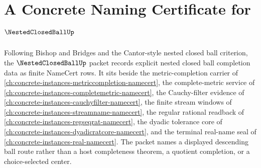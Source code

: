 \chapter{A Concrete Naming Certificate for $\NestedClosedBallUp$}
\label{ch:concrete-instances-nestedclosedball-namecert}

Following Bishop and Bridges and the Cantor-style nested closed ball criterion, the $\NestedClosedBallUp$ packet records explicit nested closed ball completion data as finite NameCert rows. It sits beside the metric-completion carrier of \autoref{ch:concrete-instances-metriccompletion-namecert}, the complete-metric service of \autoref{ch:concrete-instances-completemetric-namecert}, the Cauchy-filter evidence of \autoref{ch:concrete-instances-cauchyfilter-namecert}, the finite stream windows of \autoref{ch:concrete-instances-streamname-namecert}, the regular rational readback of \autoref{ch:concrete-instances-regseqrat-namecert}, the dyadic tolerance core of \autoref{ch:concrete-instances-dyadicratcore-namecert}, and the terminal real-name seal of \autoref{ch:concrete-instances-real-namecert}. The packet names a displayed descending ball route rather than a host completeness theorem, a quotient completion, or a choice-selected center.

